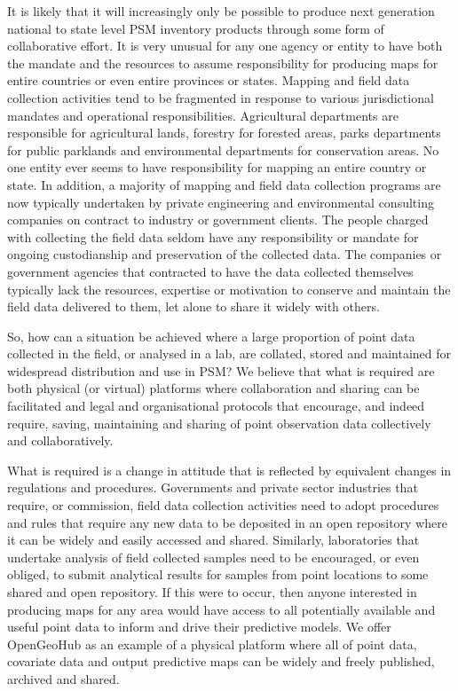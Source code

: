 \documentclass[graybox,natbib,nospthms,UStrade]{svmono}
\begin{document}
It is likely that it will increasingly only be possible to produce next
generation national to state level PSM inventory products through some
form of collaborative effort. It is very unusual for any one agency or entity to have both the mandate
and the resources to assume responsibility for producing maps for entire
countries or even entire provinces or states. Mapping and field data
collection activities tend to be fragmented in response to various
jurisdictional mandates and operational responsibilities. Agricultural
departments are responsible for agricultural lands, forestry for
forested areas, parks departments for public parklands and environmental
departments for conservation areas. No one entity ever seems to have
responsibility for mapping an entire country or state. In addition, a
majority of mapping and field data collection programs are now typically
undertaken by private engineering and environmental consulting companies
on contract to industry or government clients. The people charged with
collecting the field data seldom have any responsibility or mandate for
ongoing custodianship and preservation of the collected data. The
companies or government agencies that contracted to have the data
collected themselves typically lack the resources, expertise or
motivation to conserve and maintain the field data delivered to them,
let alone to share it widely with others.

So, how can a situation be achieved where a large proportion of point
data collected in the field, or analysed in a lab, are collated, stored
and maintained for widespread distribution and use in PSM? We believe
that what is required are both physical (or virtual) platforms where
collaboration and sharing can be facilitated and legal and
organisational protocols that encourage, and indeed require, saving,
maintaining and sharing of point observation data collectively and
collaboratively.

What is required is a change in attitude that is reflected by equivalent
changes in regulations and procedures. Governments and private sector
industries that require, or commission, field data collection activities
need to adopt procedures and rules that require any new data to be
deposited in an open repository where it can be widely and easily
accessed and shared. Similarly, laboratories that undertake analysis of
field collected samples need to be encouraged, or even obliged, to
submit analytical results for samples from point locations to some
shared and open repository. If this were to occur, then anyone
interested in producing maps for any area would have access to all
potentially available and useful point data to inform and drive their
predictive models. We offer OpenGeoHub as an example of a physical
platform where all of point data, covariate data and output predictive
maps can be widely and freely published, archived and shared.
\end{document}
